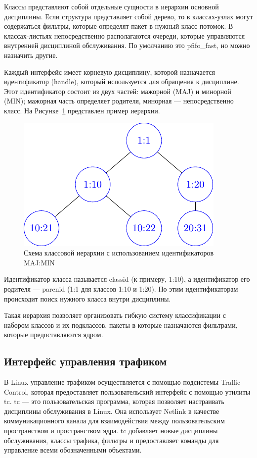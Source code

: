 	Классы представляют собой отдельные сущности в иерархии основной дисциплины.
	Если структура представляет собой дерево, то в классах-узлах могут содержаться
	фильтры, которые определят пакет в нужный класс-потомок. В классах-листьях
	непосредственно располагаются очереди, которые управляются внутренней дисциплиной
	обслуживания. По умолчанию это pfifo\_fast, но можно назначить другие. 

	Каждый интерфейс имеет корневую дисциплину, которой
	назначается идентификатор (handle), который используется для обращения к дисциплине.
	Этот идентификатор состоит из двух частей: мажорной (MAJ) и минорной (MIN); мажорная
	часть определяет родителя, минорная --- непосредственно класс. На Рисунке~\ref{pic:clheirh}
	представлен пример иерархии.

	\begin{figure}[ht!]
		\centering
		\includegraphics[scale=1.3]{./pdfimages/class_hierh.pdf}
		\caption{Схема классовой иерархии с использованием идентификаторов MAJ:MIN}
		\label{pic:clheirh}
	\end{figure}

	Идентификатор класса называется classid (к примеру, 1:10),
	а идентификатор его родителя --- parenid (1:1 для классов 1:10 и 1:20). По этим
	идентификаторам происходит поиск нужного класса внутри дисциплины.

	Такая иерархия позволяет организовать гибкую систему классификации с набором классов
	и их подклассов, пакеты в которые назначаются фильтрами, которые предоставляются ядром.

	\subsection{Интерфейс управления трафиком}

	В Linux управление трафиком осуществляется с помощью подсистемы Traffic Control,
	которая предоставляет пользовательский интерфейс с помощью утилиты {tc}.
	{tc} --- это пользовательская программа, которая позволяет настраивать
	дисциплины обслуживания в Linux. Она использует Netlink в качестве
	коммуникационного канала для взаимодействия между пользовательским
	пространством и пространством ядра. {tc} добавляет новые дисциплины
	обслуживания, классы трафика, фильтры и предоставляет команды для
	управление всеми обозначенными объектами.\cite{tcpip}

